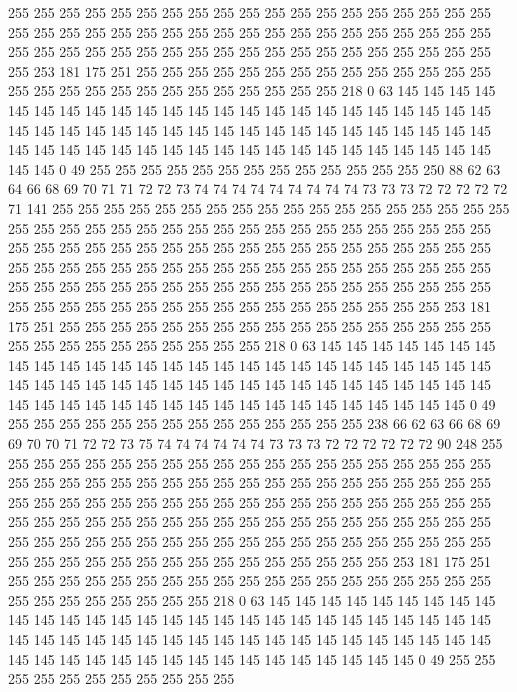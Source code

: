 255 255 255 255 255 255 255 255 255 255 255 255 255 255 255 255 255 255 255 255
255 255 255 255 255 255 255 255 255 255 255 255 255 255 255 255 255 255 255 255
255 255 255 255 255 255 255 255 255 255 255 255 255 255 255 255 255 255 253 181
175 251 255 255 255 255 255 255 255 255 255 255 255 255 255 255 255 255 255 255
255 255 255 255 255 255 255 255 255 218 0 63 145 145 145 145 145 145 145 145
145 145 145 145 145 145 145 145 145 145 145 145 145 145 145 145 145 145 145 145
145 145 145 145 145 145 145 145 145 145 145 145 145 145 145 145 145 145 145 145
145 145 145 145 145 145 145 145 145 145 145 145 145 145 145 0 49 255 255 255
255 255 255 255 255 255 255 255 255 255 250 88 62 63 64 66 68 69 70 71
71 72 72 73 74 74 74 74 74 74 74 74 74 73 73 73 72 72 72 72
72 71 141 255 255 255 255 255 255 255 255 255 255 255 255 255 255 255 255 255
255 255 255 255 255 255 255 255 255 255 255 255 255 255 255 255 255 255 255 255
255 255 255 255 255 255 255 255 255 255 255 255 255 255 255 255 255 255 255 255
255 255 255 255 255 255 255 255 255 255 255 255 255 255 255 255 255 255 255 255
255 255 255 255 255 255 255 255 255 255 255 255 255 255 255 255 255 255 255 255
255 255 255 255 255 255 255 255 255 255 255 255 255 255 253 181 175 251 255 255
255 255 255 255 255 255 255 255 255 255 255 255 255 255 255 255 255 255 255 255
255 255 255 255 255 218 0 63 145 145 145 145 145 145 145 145 145 145 145 145
145 145 145 145 145 145 145 145 145 145 145 145 145 145 145 145 145 145 145 145
145 145 145 145 145 145 145 145 145 145 145 145 145 145 145 145 145 145 145 145
145 145 145 145 145 145 145 145 145 145 145 0 49 255 255 255 255 255 255 255
255 255 255 255 255 255 255 238 66 62 63 66 68 69 69 70 70 71 72 72
73 75 74 74 74 74 74 74 73 73 73 72 72 72 72 72 72 90 248 255
255 255 255 255 255 255 255 255 255 255 255 255 255 255 255 255 255 255 255 255
255 255 255 255 255 255 255 255 255 255 255 255 255 255 255 255 255 255 255 255
255 255 255 255 255 255 255 255 255 255 255 255 255 255 255 255 255 255 255 255
255 255 255 255 255 255 255 255 255 255 255 255 255 255 255 255 255 255 255 255
255 255 255 255 255 255 255 255 255 255 255 255 255 255 255 255 255 255 255 255
255 255 255 255 255 255 255 255 255 255 253 181 175 251 255 255 255 255 255 255
255 255 255 255 255 255 255 255 255 255 255 255 255 255 255 255 255 255 255 255
255 218 0 63 145 145 145 145 145 145 145 145 145 145 145 145 145 145 145 145
145 145 145 145 145 145 145 145 145 145 145 145 145 145 145 145 145 145 145 145
145 145 145 145 145 145 145 145 145 145 145 145 145 145 145 145 145 145 145 145
145 145 145 145 145 145 145 0 49 255 255 255 255 255 255 255 255 255 255 255
